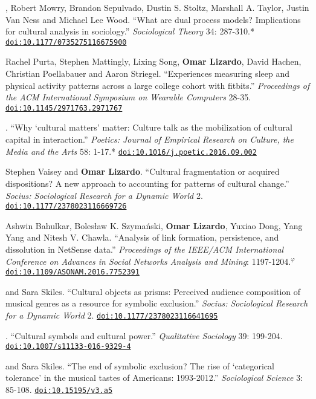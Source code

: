 
, Robert Mowry, Brandon Sepulvado, Dustin S. Stoltz, Marshall A. Taylor, Justin Van Ness and Michael Lee Wood. ``What are dual process models? Implications for cultural analysis in sociology.'' {\em Sociological Theory} 34: 287-310.\textcolor{uclablue}{*} \href{https://doi.org/10.1177/0735275116675900}{\nolinkurl{doi:10.1177/0735275116675900}}

\ind Rachel Purta, Stephen Mattingly, Lixing Song, {\bf Omar Lizardo}, David Hachen, Christian Poellabauer and  Aaron Striegel. ``Experiences measuring sleep and physical activity patterns across a large college cohort with fitbits.'' {\em Proceedings of the ACM International Symposium on Wearable Computers} 28-35. \href{https://doi.org/10.1145/2971763.2971767}{\nolinkurl{doi:10.1145/2971763.2971767}}


. ``Why `cultural matters' matter: Culture talk as the mobilization of cultural capital in interaction.'' {\em Poetics: Journal of Empirical Research on Culture, the Media and the Arts} 58: 1-17.\textcolor{uclablue}{*} \href{https://doi.org/10.1016/j.poetic.2016.09.002}{\nolinkurl{doi:10.1016/j.poetic.2016.09.002}}

\ind Stephen Vaisey and {\bf Omar Lizardo}. ``Cultural fragmentation or acquired dispositions? A new approach to accounting for patterns of cultural change.'' {\em Socius: Sociological Research for a Dynamic World} 2. \href{https://doi.org/10.1177/2378023116669726}{\nolinkurl{doi:10.1177/2378023116669726}}

\ind Ashwin	Bahulkar, Boles\l{}aw K. Szyma\'{n}ski, {\bf Omar Lizardo}, Yuxiao Dong, Yang Yang and Nitesh V. Chawla. ``Analysis of link formation, persistence, and dissolution in NetSense data.'' {\em Proceedings of the IEEE/ACM International Conference on Advances in Social Networks Analysis and Mining}: 1197-1204.\textcolor{black}{$^{\varphi}$} \href{https://doi.org/10.1109/ASONAM.2016.7752391}{\nolinkurl{doi:10.1109/ASONAM.2016.7752391}}

 and Sara Skiles. ``Cultural objects as prisms: Perceived audience composition of musical genres as a resource for symbolic exclusion.'' {\em Socius: Sociological Research for a Dynamic World} 2. \href{https://doi.org/10.1177/2378023116641695}{\nolinkurl{doi:10.1177/2378023116641695}}

. ``Cultural symbols and cultural power.'' {\em Qualitative Sociology} 39: 199-204.  \href{https://doi.org/10.1007/s11133-016-9329-4}{\nolinkurl{doi:10.1007/s11133-016-9329-4}}

 and Sara Skiles. ``The end of symbolic exclusion? The rise of `categorical tolerance' in the musical tastes of Americans: 1993-2012.'' {\em Sociological Science} 3: 85-108. \href{https://doi.org/10.15195/v3.a5}{\nolinkurl{doi:10.15195/v3.a5}}